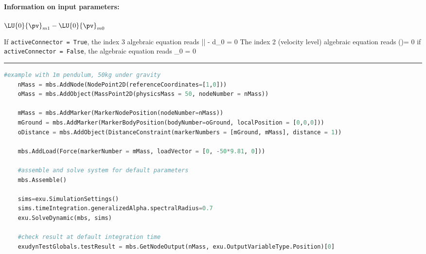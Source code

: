 \paragraph{Information on input parameters:} 
\finishTable
 \noindent
         {$\LU{0}{\pv}_{m1} - \LU{0}{\pv}_{m0}$}
    \finishTable

    If \texttt{activeConnector = True}, the index 3 algebraic equation reads
    \be
      \left|\right| - d_0 = 0
    \ee
    The index 2 (velocity level) algebraic equation reads
    \be
      \left(\right)\tp \Delta\vv = 0
    \ee
    if \texttt{activeConnector = False}, the algebraic equation reads
    \be
      \lambda_0 = 0
    \ee
\vspace{6pt}\par\noindent\rule{\textwidth}{0.4pt}
\label{miniExample_ObjectConnectorDistance}
\pythonstyle
\begin{lstlisting}[language=Python, firstnumber=1]
    #example with 1m pendulum, 50kg under gravity
    nMass = mbs.AddNode(NodePoint2D(referenceCoordinates=[1,0]))
    oMass = mbs.AddObject(MassPoint2D(physicsMass = 50, nodeNumber = nMass))
    
    mMass = mbs.AddMarker(MarkerNodePosition(nodeNumber=nMass))
    mGround = mbs.AddMarker(MarkerBodyPosition(bodyNumber=oGround, localPosition = [0,0,0]))
    oDistance = mbs.AddObject(DistanceConstraint(markerNumbers = [mGround, mMass], distance = 1))
    
    mbs.AddLoad(Force(markerNumber = mMass, loadVector = [0, -50*9.81, 0])) 

    #assemble and solve system for default parameters
    mbs.Assemble()
    
    sims=exu.SimulationSettings()
    sims.timeIntegration.generalizedAlpha.spectralRadius=0.7
    exu.SolveDynamic(mbs, sims)

    #check result at default integration time
    exudynTestGlobals.testResult = mbs.GetNodeOutput(nMass, exu.OutputVariableType.Position)[0]

\end{lstlisting}

